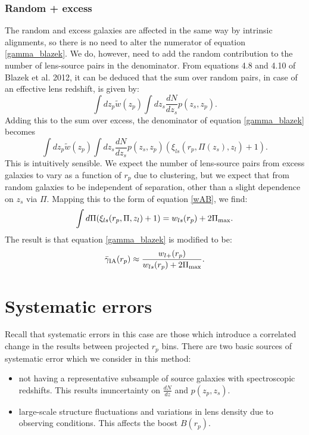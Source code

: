 \documentclass[onecolumn,amsmath,aps,fleqn, superscriptaddress]{revtex4}
\begin{document}
\subsubsection*{Random + excess}
The random and excess galaxies are affected in the same way by intrinsic alignments, so there is no need to alter the numerator of equation \ref{gamma_blazek}.
 We do, however, need to add the random contribution to the number of lens-source pairs in the denominator. From equations 4.8 and 4.10 of Blazek et al. 2012, it can be deduced that the sum over random pairs, in case of an effective lens redshift, is given by:
\begin{equation}
\int dz_p \tilde{w}(z_p) \int dz_s \frac{dN}{dz_s} p(z_s, z_p).
\end{equation}
Adding this to the sum over excess, the denominator of equation \ref{gamma_blazek} becomes
\begin{equation}
\int dz_p \tilde{w}(z_p) \int dz_s \frac{dN}{dz_s} p(z_s, z_p) \left(\xi_{ls}(r_p, \Pi(z_s), z_l) + 1\right).
\label{denom_rand}
\end{equation}
This is intuitively sensible. We expect the number of lens-source pairs from excess galaxies to vary as a function of $r_p$ due to clustering, but we expect that from random galaxies to be independent of separation, other than a slight dependence on $z_s$ via $\Pi$. Mapping this to the form of equation \ref{wAB}, we find:
\begin{equation}
\int d\Pi (\xi_{ls}(r_p, \Pi, z_l) + 1) = w_{ls}(r_p) + 2\Pi_{\rm max}.
\label{wl}
\end{equation}
The result is that equation \ref{gamma_blazek} is modified to be:
\begin{equation}
\bar{\gamma}_{\rm IA}(r_p) \approx \frac{w_{l+}(r_p)}{w_{ls}(r_p) + 2 \Pi_{\rm max}}.
\label{gamma_blazek_randoms}
\end{equation} 

\section{Systematic errors}
Recall that systematic errors in this case are those which introduce a correlated change in the results between projected $r_p$ bins. There are two basic sources of systematic error which we consider in this method: 
\begin{itemize}
\item{not having a representative subsample of source galaxies with spectroscopic redshifts. This results inuncertainty on $\frac{dN}{dz}$ and $p(z_p, z_s)$.}
\item{large-scale structure fluctuations and variations in lens density due to observing conditions. This affects the boost $B(r_p)$.}
\end{itemize}
\end{document}
